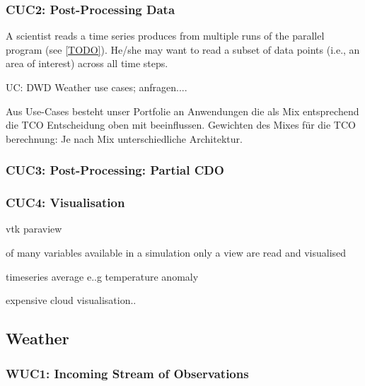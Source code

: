 {%
\subsubsection{CUC2: Post-Processing Data}

A scientist reads a time series produces from multiple runs of the parallel program (see \ref{TODO}).
He/she may want to read a subset of data points (i.e., an area of interest) across all time steps.


UC: DWD Weather use cases; anfragen....


Aus Use-Cases besteht unser Portfolie an Anwendungen die als Mix entsprechend die TCO Entscheidung oben mit beeinflussen.
Gewichten des Mixes für die TCO berechnung: Je nach Mix unterschiedliche Architektur.


\subsubsection{CUC3: Post-Processing: Partial CDO}





\subsubsection{CUC4: Visualisation}



vtk
paraview


of many variables available in a simulation only a view are read and visualised

timeseries
average e..g temperature anomaly

expensive cloud visualisation..





\newpage
\subsection{Weather}



\subsubsection{WUC1: Incoming Stream of Observations}

}
